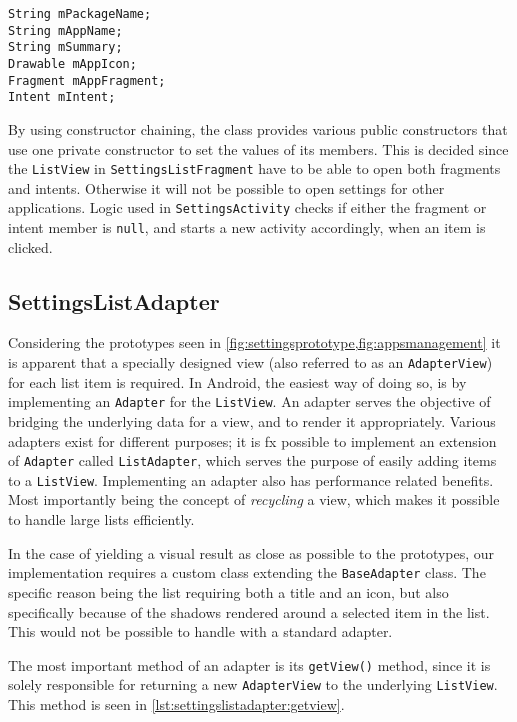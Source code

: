\begin{lstlisting}[caption={Members of the \lstinline|SettingsListItem| class.}, label={lst:settingslistitem}]
String mPackageName;
String mAppName;
String mSummary;
Drawable mAppIcon;
Fragment mAppFragment;
Intent mIntent;
\end{lstlisting}

By using constructor chaining, the class provides various public constructors that use one private constructor to set the values of its members.
This is decided since the \lstinline|ListView| in \lstinline|SettingsListFragment| have to be able to open both fragments and intents.
Otherwise it will not be possible to open settings for other \giraf applications.
Logic used in \lstinline|SettingsActivity| checks if either the fragment or intent member is \lstinline|null|, and starts a new activity accordingly, when an item is clicked.

\subsection{SettingsListAdapter}\label{sec:settingslistadapter}
Considering the prototypes seen in \cref{fig:settingsprototype,fig:appsmanagement} it is apparent that a specially designed view (also referred to as an \lstinline|AdapterView|) for each list item is required.
In Android, the easiest way of doing so, is by implementing an \lstinline|Adapter| for the \lstinline|ListView|.
An adapter serves the objective of bridging the underlying data for a view, and to render it appropriately.
Various adapters exist for different purposes; it is fx possible to implement an extension of \lstinline|Adapter| called \lstinline|ListAdapter|, which serves the purpose of easily adding items to a \lstinline|ListView|.
Implementing an adapter also has performance related benefits.
Most importantly being the concept of \textit{recycling} a view, which makes it possible to handle large lists efficiently.

In the case of yielding a visual result as close as possible to the prototypes, our implementation requires a custom class extending the \lstinline|BaseAdapter| class.
The specific reason being the list requiring both a title and an icon, but also specifically because of the shadows rendered around a selected item in the list.
This would not be possible to handle with a standard adapter.

The most important method of an adapter is its \lstinline|getView()| method, since it is solely responsible for returning a new \lstinline|AdapterView| to the underlying \lstinline|ListView|.
This method is seen in \cref{lst:settingslistadapter:getview}.

